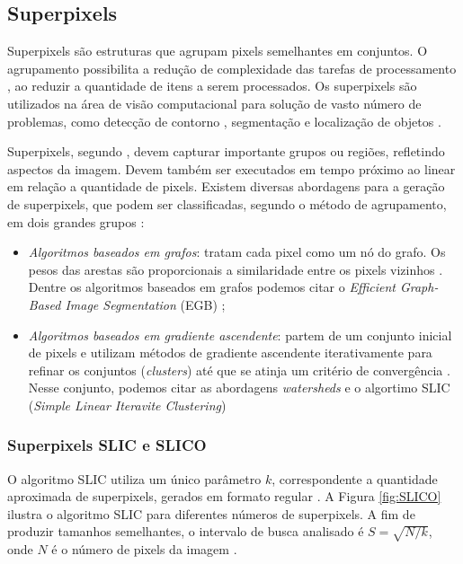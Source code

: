 \begin{document}
\subsection{Superpixels} \label{ssec:super}

Superpixels são estruturas que agrupam pixels semelhantes em conjuntos. O agrupamento possibilita a redução de complexidade das tarefas de processamento \cite{SLIC}, ao reduzir a quantidade de itens a serem processados. Os superpixels são utilizados na área de visão computacional para solução de vasto número de problemas, como detecção de contorno \cite{CONTOUR}, segmentação \cite{SEG_MERGE} e localização de objetos \cite{SEG_LOCALIZ}.

Superpixels, segundo \cite{FELZENSZWALB}, devem capturar importante grupos ou regiões, refletindo aspectos da imagem. Devem também ser executados em tempo próximo ao linear em relação a quantidade de pixels. Existem diversas abordagens para a geração de superpixels, que podem ser classificadas, segundo o método de agrupamento, em dois grandes grupos \cite{SLIC}: 

\begin{itemize}
 \item \textit{Algoritmos baseados em grafos}: tratam cada pixel como um nó do grafo. Os pesos das arestas são proporcionais a similaridade entre os pixels vizinhos \cite{SLIC}. Dentre os algoritmos baseados em grafos podemos citar o \textit{Efficient Graph-Based Image Segmentation} (EGB) \cite{FELZENSZWALB};
 \item \textit{Algoritmos baseados em gradiente ascendente}: partem de um conjunto inicial de pixels e utilizam métodos de gradiente ascendente iterativamente para refinar os conjuntos (\textit{clusters}) até que se atinja um critério de convergência \cite{SLIC}. Nesse conjunto, podemos  citar as abordagens \textit{watersheds} \cite{WATERSHEDS} e o algortimo SLIC (\textit{Simple Linear Iteravite Clustering}) \cite{SLIC}
\end{itemize}


\subsubsection{Superpixels SLIC e SLICO} \label{sssec:slic}

O algoritmo SLIC utiliza um único parâmetro $k$, correspondente a quantidade aproximada de superpixels, gerados em formato regular \cite{SLIC}. A Figura \ref{fig:SLICO} ilustra o algoritmo SLIC para diferentes números de superpixels. A fim de produzir tamanhos semelhantes, o intervalo de busca analisado é \mbox{$S=\sqrt{N/k}$}, onde $N$ é o número de pixels da imagem \cite{SLIC}. 
\end{document}
